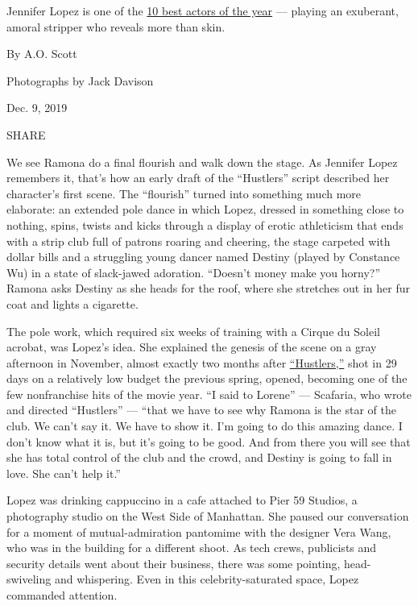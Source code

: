 Jennifer Lopez is one of the
\href{https://www.nytimes3xbfgragh.onion/interactive/2019/12/09/magazine/best-actors.html}{10
best actors of the year} --- playing an exuberant, amoral stripper who
reveals more than skin.

By A.O. Scott

Photographs by Jack Davison

Dec. 9, 2019

SHARE

We see Ramona do a final flourish and walk down the stage. As Jennifer
Lopez remembers it, that's how an early draft of the ``Hustlers'' script
described her character's first scene. The ``flourish'' turned into
something much more elaborate: an extended pole dance in which Lopez,
dressed in something close to nothing, spins, twists and kicks through a
display of erotic athleticism that ends with a strip club full of
patrons roaring and cheering, the stage carpeted with dollar bills and a
struggling young dancer named Destiny (played by Constance Wu) in a
state of slack-jawed adoration. ``Doesn't money make you horny?'' Ramona
asks Destiny as she heads for the roof, where she stretches out in her
fur coat and lights a cigarette.

The pole work, which required six weeks of training with a Cirque du
Soleil acrobat, was Lopez's idea. She explained the genesis of the scene
on a gray afternoon in November, almost exactly two months after
\href{https://www.nytimes3xbfgragh.onion/2019/09/11/movies/hustlers-review.html}{``Hustlers,''}
shot in 29 days on a relatively low budget the previous spring, opened,
becoming one of the few nonfranchise hits of the movie year. ``I said to
Lorene'' --- Scafaria, who wrote and directed ``Hustlers'' --- ``that we
have to see why Ramona is the star of the club. We can't say it. We have
to show it. I'm going to do this amazing dance. I don't know what it is,
but it's going to be good. And from there you will see that she has
total control of the club and the crowd, and Destiny is going to fall in
love. She can't help it.''

Lopez was drinking cappuccino in a cafe attached to Pier 59 Studios, a
photography studio on the West Side of Manhattan. She paused our
conversation for a moment of mutual-admiration pantomime with the
designer Vera Wang, who was in the building for a different shoot. As
tech crews, publicists and security details went about their business,
there was some pointing, head-swiveling and whispering. Even in this
celebrity-saturated space, Lopez commanded attention.

